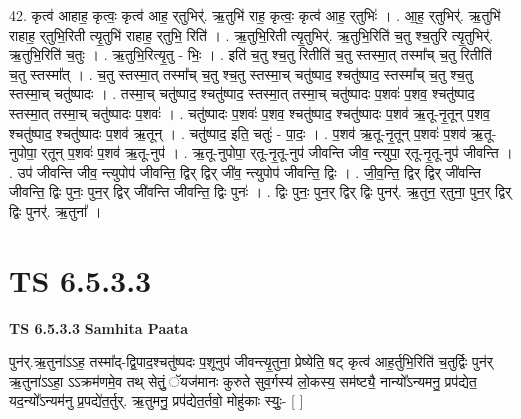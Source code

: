 \documentclass[17pt]{extarticle}
\begin{document}
42. कृत्व॑ आहाह॒ कृत्वः॒ कृत्व॑ आह॒ र्‌तुभिर्॑. ऋ॒तुभि॑ राह॒ कृत्वः॒ कृत्व॑ आह॒ र्‌तुभिः॑ । . आ॒ह॒ र्‌तुभिर्॑. ऋ॒तुभि॑ राहाह॒ र्‌तुभि॒रिती त्यृ॒तुभि॑ राहाह॒ र्‌तुभि॒ रिति॑ । . ऋ॒तुभि॒रिती त्यृ॒तुभिर्॑. ऋ॒तुभि॒रिति॑ च॒तु श्च॒तुरि त्यृ॒तुभिर्॑. ऋ॒तुभि॒रिति॑ च॒तुः । . ऋ॒तुभि॒रित्यृ॒तु - भिः॒ । . इति॑ च॒तु श्च॒तु रितीति॑ च॒तु स्तस्मा॒त् तस्मा᳚च् च॒तु रितीति॑ च॒तु स्तस्मा᳚त् । . च॒तु स्तस्मा॒त् तस्मा᳚च् च॒तु श्च॒तु स्तस्मा॒च् चतु॑ष्पाद॒ श्चतु॑ष्पाद॒ स्तस्मा᳚च् च॒तु श्च॒तु स्तस्मा॒च् चतु॑ष्पादः । . तस्मा॒च् चतु॑ष्पाद॒ श्चतु॑ष्पाद॒ स्तस्मा॒त् तस्मा॒च् चतु॑ष्पादः प॒शवः॑ प॒शव॒ श्चतु॑ष्पाद॒ स्तस्मा॒त् तस्मा॒च् चतु॑ष्पादः प॒शवः॑ । . चतु॑ष्पादः प॒शवः॑ प॒शव॒ श्चतु॑ष्पाद॒ श्चतु॑ष्पादः प॒शव॑ ऋ॒तू-नृ॒तून् प॒शव॒ श्चतु॑ष्पाद॒ श्चतु॑ष्पादः प॒शव॑ ऋ॒तून् । . चतु॑ष्पाद॒ इति॒ चतुः॑ - पा॒दः॒ । . प॒शव॑ ऋ॒तू-नृ॒तून् प॒शवः॑ प॒शव॑ ऋ॒तू-नुपोपा॒ र्‌तून् प॒शवः॑ प॒शव॑ ऋ॒तू-नुप॑ । . ऋ॒तू-नुपोपा॒ र्‌तू-नृ॒तू-नुप॑ जीवन्ति जीव॒ न्त्युपा॒ र्‌तू-नृ॒तू-नुप॑ जीवन्ति । . उप॑ जीवन्ति जीव॒ न्त्युपोप॑ जीवन्ति॒ द्विर् द्विर् जी॑व॒ न्त्युपोप॑ जीवन्ति॒ द्विः । . जी॒व॒न्ति॒ द्विर् द्विर् जी॑वन्ति जीवन्ति॒ द्विः पुनः॒ पुन॒र् द्विर् जी॑वन्ति जीवन्ति॒ द्विः पुनः॑ । . द्विः पुनः॒ पुन॒र् द्विर् द्विः पुनर्॑. ऋ॒तुन॒ र्‌तुना॒ पुन॒र् द्विर् द्विः पुनर्॑. ऋ॒तुना᳚ । \newline
\pagebreak
{}

\section{ TS 6.5.3.3 }

\textbf{TS 6.5.3.3 } \newline
\textbf{Samhita Paata} \newline

पुन॑र्.ऋ॒तुना॑ऽऽह॒ तस्मा᳚द्-द्वि॒पाद॒श्चतु॑ष्पदः प॒शूनुप॑ जीवन्त्यृ॒तुना॒ प्रेष्येति॒ षट् कृत्व॑ आह॒र्तुभि॒रिति॑ च॒तुर्द्विः पुन॑र् ऋ॒तुना॑ऽऽहा॒ ऽऽक्रम॑णमे॒व तथ् सेतुं॒ ॅयज॑मानः कुरुते सुव॒र्गस्य॑ लो॒कस्य॒ सम॑ष्ट्यै॒ नान्यो᳚ऽन्यमनु॒ प्रप॑द्येत॒ यद॒न्यो᳚ऽन्यम॑नु प्र॒पद्ये॑त॒र्तुर्. ऋ॒तुमनु॒ प्रप॑द्येत॒र्तवो॒ मोहु॑काः स्युः॒- [  ] \newline
\end{document}

